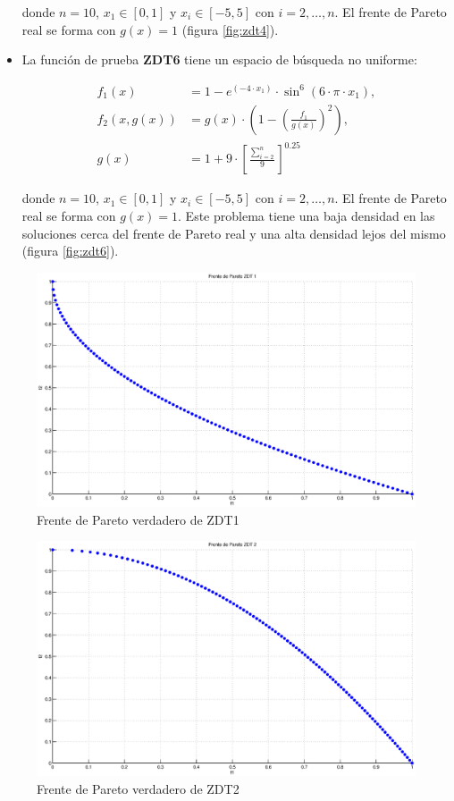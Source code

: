 \begin{itemize}
donde $n=10$, $x_1\in[0,1]$ y $x_i \in[-5,5] $ con $i=2, \ldots, n$. El frente de Pareto real se forma con $g(x)=1$ (figura \ref{fig:zdt4}).

\item La funci\'on de prueba \textbf{ZDT6} tiene un espacio de b\'usqueda no uniforme:

\begin{align*}
f_1(x)&=1- e^{(-4\cdot x_1)} \cdot \sin^6(6\cdot\pi\cdot x_1),\\
f_2(x,g(x))&=g(x)\cdot(1-\left(\frac{f_1}{g(x)}\right)^2),\\
g(x)&=1+9\cdot\left[\frac{\sum_{i=2}^n}{9}\right]^{0.25}
\end{align*}

donde $n=10$, $x_1\in[0,1]$ y $x_i \in[-5,5]$ con $i= 2, \ldots, n$. El frente de Pareto real se forma con $g(x)=1$.
Este problema tiene una baja densidad en las soluciones cerca del frente de Pareto real y una alta densidad lejos del mismo (figura \ref{fig:zdt6}).

\end{itemize}

\begin{figure}
\centering
    \centering
    \includegraphics[scale=0.4]{ApendiceA/paretoZDT1.eps}
    \caption{Frente de Pareto verdadero de ZDT1}
    \label{fig:zdt1}
\end{figure}
 
\begin{figure}
\centering
 
    \centering
    \includegraphics[scale=0.4]{ApendiceA/paretoZDT2.eps}
    \caption{Frente de Pareto verdadero de ZDT2}
    \label{fig:zdt2}
\end{figure}

